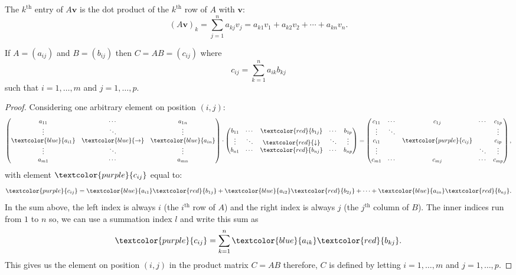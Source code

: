 \documentclass[12pt, a4paper]{article}
\begin{document}
\begin{mdthm}
    The \(k^{\text{th}}\) entry of \(A\bm{v}\) is the dot product of the \(k^{\text{th}}\) row of \(A\) with \(\bm{v}\):
    \[(A\bm{v})_k = \sum_{j=1}^{n} a_{kj}v_{j} = a_{k1} v_1 + a_{k2} v_2 +\cdots + a_{kn} v_n.\]
\end{mdthm}

\begin{mdthm}
    If \(A = (a_{ij})\) and \(B = (b_{ij})\) then \(C=AB = (c_{ij})\) where 
    \[c_{ij} = \sum_{k=1}^{n} a_{ik} b_{kj}\]
    such that \(i = 1,\ldots, m\) and \(j=1,\ldots ,p\).
\end{mdthm}

\begin{proof}
    Considering one arbitrary element on position \((i,j)\):
    \[
        \begin{pmatrix}
        a_{11} & \cdots & a_{1n} \\
        \vdots & \ddots & \vdots \\
        \textcolor{blue}{a_{i1}} & \textcolor{blue}{\to} & \textcolor{blue}{a_{in}}  \\
        \vdots & \ddots & \vdots \\
        a_{m1} & \cdots & a_{mn}
        \end{pmatrix}
        \cdot
        \begin{pmatrix}
            b_{11} & \cdots & \textcolor{red}{b_{1j}} & \cdots & b_{1p} \\
            \vdots & \ddots & \textcolor{red}{\downarrow} & \ddots & \vdots \\
            b_{n1} & \cdots & \textcolor{red}{b_{nj}} & \cdots & b_{np}
        \end{pmatrix}
        =
        \begin{pmatrix}
            c_{11} & \cdots & c_{1j} & \cdots & c_{1p} \\
            \vdots & \ddots &         &        & \vdots \\
            c_{i1} &        & \textcolor{purple}{c_{ij}} & & c_{ip} \\
            \vdots & & & \ddots & \vdots \\
            c_{m1} & \cdots & c_{mj} & \cdots & c_{mp}
        \end{pmatrix},
    \]
    with element \(\textcolor{purple}{c_{ij}}\) equal to:
    \[\textcolor{purple}{c_{ij}} = \textcolor{blue}{a_{i1}} \textcolor{red}{b_{1j}} + \textcolor{blue}{a_{i2}}\textcolor{red}{b_{2j}} + \cdots + \textcolor{blue}{a_{in}} \textcolor{red}{b_{nj}}.\]
    In the sum above, the left index is always \(i\) (the \(i^{\text{th}}\) row of \(A\)) and the right index is always \(j\) (the \(j^{\text{th}}\) column of \(B\)). The inner indices run from \(1\) to \(n\) so, we can use a summation index \(l\) and write this sum as 
    \[\textcolor{purple}{c_{ij}} = \sum_{k=1}^{n} \textcolor{blue}{a_{ik}} \textcolor{red}{b_{kj}}.\]
    This gives us the element on position \((i,j)\) in the product matrix \(C = AB\) therefore, \(C\) is defined by letting \(i=1, \ldots, m\) and \(j=1, \ldots,p\).
\end{proof}
\end{document}
